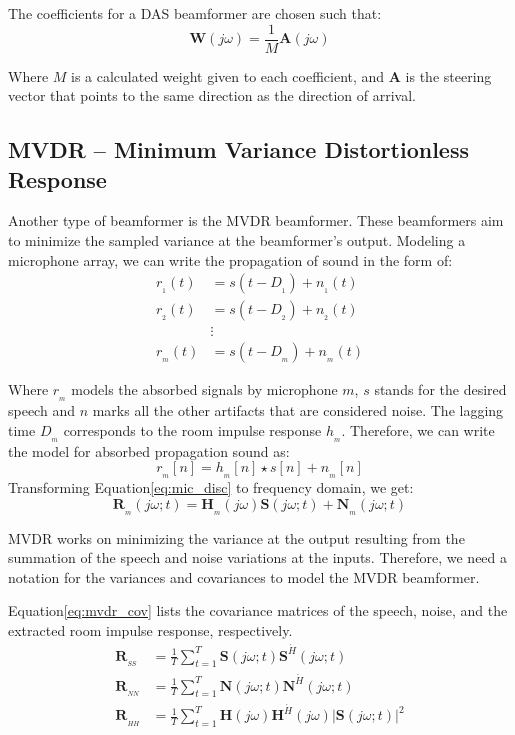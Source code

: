 The coefficients for a DAS beamformer are chosen such that:
\begin{equation}
    \mathbf{W}(j\omega) = \frac{1}{M} \mathbf{A}(j\omega)
\end{equation}

Where \(M\) is a calculated weight given to each coefficient, and
\(\mathbf{A}\) is the steering vector that points 
to the same direction as the direction of arrival.

\subsection{MVDR -- Minimum Variance Distortionless Response}
Another type of beamformer is the MVDR beamformer.
These beamformers aim to minimize the 
sampled variance at the beamformer's output. 
Modeling a microphone array, we can write the propagation of sound 
in the form of:
\begin{align}
    r_{_{1}}(t) &= s(t-D_{_{1}}) + n_{_{1}}(t) \nonumber \\
    r_{_{2}}(t) &= s(t-D_{_{2}}) + n_{_{2}}(t) \nonumber \\
    & \vdots  \nonumber \\
    r_{_{m}}(t) &= s(t-D_{_{m}}) + n_{_{m}}(t)
\end{align}

Where \(r_{_{m}}\) models the absorbed signals by microphone
\(m\), \(s\) stands for the desired speech and \(n\) 
marks all the other artifacts that are considered noise. 
The lagging time \(D_{_{m}}\) corresponds to the room impulse
response \(h_{_{m}}\). Therefore, we can write 
the model for absorbed propagation sound as:
\begin{equation}\label{eq:mic_disc}
    r_{_{m}}[n] = h_{_{m}}[n]\star s[n] + n_{_{m}}[n]
\end{equation}
Transforming Equation\;\ref{eq:mic_disc} to frequency domain,
we get:
\begin{equation}\label{eq:mic_disc}
    \mathbf{R}_{_{m}}(j\omega;t) = \mathbf{H}_{_{m}}(j\omega)\mathbf{S}(j\omega;t) + \mathbf{N}_{_{m}}(j\omega;t)
\end{equation}

MVDR works on minimizing the variance at the 
output resulting from the summation of the 
speech and noise variations at the inputs. 
Therefore, we need a notation for the variances 
and covariances to model the MVDR beamformer. 

Equation\;\ref{eq:mvdr_cov} lists the covariance matrices of the
speech, noise, and the extracted room impulse response, respectively.
\begin{align}\label{eq:mvdr_cov}
    \mathbf{R}_{_{SS}} &= \frac{1}{T}\sum_{t=1}^{T}\mathbf{S}(j\omega;t)\mathbf{S}^{\acute{H}}(j\omega;t) \nonumber \\
    \mathbf{R}_{_{NN}} &= \frac{1}{T}\sum_{t=1}^{T}\mathbf{N}(j\omega;t)\mathbf{N}^{\acute{H}}(j\omega;t)\nonumber \\
    \mathbf{R}_{_{HH}} &= \frac{1}{T}\sum_{t=1}^{T}\mathbf{H}(j\omega)\mathbf{H}^{\acute{H}}(j\omega)|\mathbf{S}(j\omega;t)|^{2} 
\end{align}

